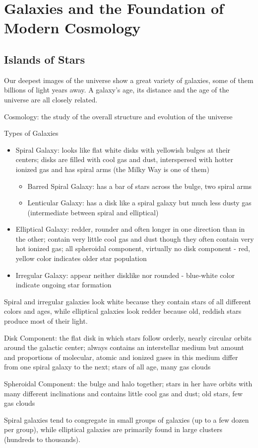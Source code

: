 \documentclass[12pt]{article}
\begin{document}
\section{Galaxies and the Foundation of Modern Cosmology}
\subsection{Islands of Stars}
Our deepest images of the universe show a great variety of galaxies, some of them billions of light years away. A galaxy's age, its distance and the age of the universe are all closely related. 
\begin{definition} Cosmology: the study of the overall structure and evolution of the universe \end{definition}
Types of Galaxies \begin{itemize} 
\item Spiral Galaxy: looks like flat white disks with yellowish bulges at their centers; disks are filled with cool gas and dust, interspersed with hotter ionized gas and has spiral arms (the Milky Way is one of them) \begin{itemize}
\item Barred Spiral Galaxy: has a bar of stars across the bulge, two spiral arms
\item Lenticular Galaxy: has a disk like a spiral galaxy but much less dusty gas (intermediate between spiral and elliptical) \end{itemize}
\item Elliptical Galaxy: redder, rounder and often longer in one direction than in the other; contain very little cool gas and dust though they often contain very hot ionized gas; all spheroidal component, virtually no disk component - red, yellow color indicates older star population
\item Irregular Galaxy: appear neither disklike nor rounded - blue-white color indicate ongoing star formation \end{itemize} 
Spiral and irregular galaxies look white because they contain stars of all different colors and ages, while elliptical galaxies look redder because old, reddish stars produce most of their light. 
\begin{definition} Disk Component: the flat disk in which stars follow orderly, nearly circular orbits around the galactic center; always contains an interstellar medium but amount and proportions of molecular, atomic and ionized gases in this medium differ from one spiral galaxy to the next; stars of all age, many gas clouds \end{definition}
\begin{definition} Spheroidal Component: the bulge and halo together; stars in her have orbits with many different inclinations and contains little cool gas and dust; old stars, few gas clouds \end{definition}
Spiral galaxies tend to congregate in small groups of galaxies (up to a few dozen per group), while elliptical galaxies are primarily found in large clusters (hundreds to thousands). 
\end{document}
